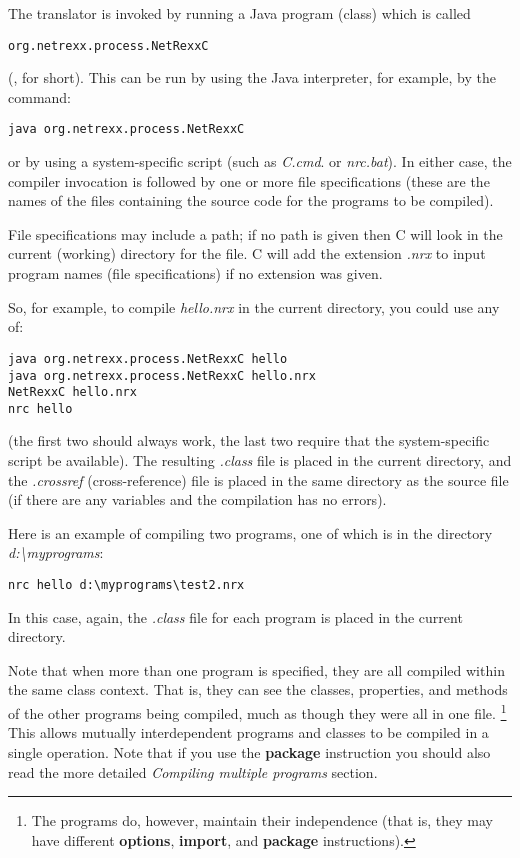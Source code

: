 The translator is invoked by running a Java program (class) which is
called 
\begin{verbatim}
org.netrexx.process.NetRexxC
\end{verbatim}  
(, for short). This can be run by using the Java interpreter, for example,
by the command:
\begin{verbatim}
java org.netrexx.process.NetRexxC
\end{verbatim}
or by using a system-specific script (such as \emph{\nr{}C.cmd}.
or \emph{nrc.bat}).  In either case, the compiler invocation is followed
by one or more file specifications (these are the names of the files
containing the \nr{} source code for the programs to be compiled).

File specifications may include a path; if no path is given then
\nr{}C will look in the current (working) directory for the file.
\nr{}C will add the extension \emph{.nrx} to input program names (file
specifications) if no extension was given.

So, for example, to compile \emph{hello.nrx} in the current directory,
you could use any of:
\begin{verbatim}
java org.netrexx.process.NetRexxC hello
java org.netrexx.process.NetRexxC hello.nrx
NetRexxC hello.nrx
nrc hello
\end{verbatim}
(the first two should always work, the last two require that the
system-specific script be available).  The resulting \emph{.class} file
is placed in the current directory, and the \emph{.crossref}
(cross-reference) file is placed in the same directory as the source
file (if there are any variables and the compilation has no errors).

Here is an example of compiling two programs, one of which is in the
directory \emph{d:\textbackslash myprograms}:
\begin{verbatim}
nrc hello d:\myprograms\test2.nrx
\end{verbatim}

In this case, again, the \emph{.class} file for each program is placed
in the current directory.

Note that when more than one program is specified, they are all compiled
within the same class context.  That is, they can see the
classes, properties, and methods of the other programs being compiled,
much as though they were all in one file.
\footnote{The programs do, however, maintain their independence (that is, they may
have different \textbf{options}, \textbf{import}, and \textbf{package}
instructions).}
This allows mutually interdependent programs and classes to be compiled
in a single operation.
Note that if you use the \textbf{package} instruction you should also
read the more detailed \emph{Compiling multiple
programs} section.%

